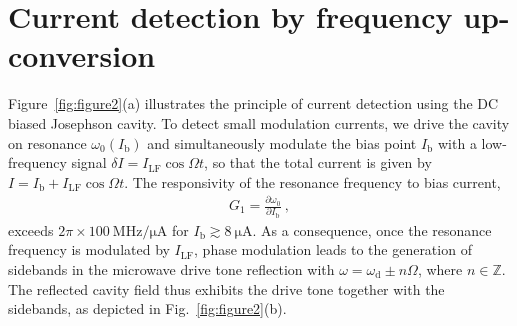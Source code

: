 
\section{Current detection by frequency up-conversion}
% 
Figure~\ref{fig:figure2}(a) illustrates the principle of current detection using the DC biased Josephson cavity.
% 
To detect small modulation currents, we drive the cavity on resonance $\omega_0(I_\text{b})$ and simultaneously modulate the bias point $I_\text{b}$ with a low-frequency signal $\delta I=I_\text{LF}\cos{\Omega t}$, so that the total current is given by $I=I_\text{b}+I_\text{LF}\cos\Omega t$.
% 
The responsivity of the resonance frequency to bias current,
\begin{align}
G_1 = \frac{\partial\omega_0}{\partial I_\text{b}} \ ,
\end{align}
exceeds $2\pi\times\SI{100}{\mega\hertz\per\micro\ampere}$ for $I_\text{b}\gtrsim\SI{8}{\micro\ampere}$.
% 
As a consequence, once the resonance frequency is modulated by $I_\text{LF}$, phase modulation leads to the generation of sidebands in the microwave drive tone reflection with $\omega = \omega_\text{d} \pm n \Omega$, where $n \in \mathbb{Z}$.
% 
The reflected cavity field thus exhibits the drive tone together with the sidebands, as depicted in Fig.~\ref{fig:figure2}(b).


